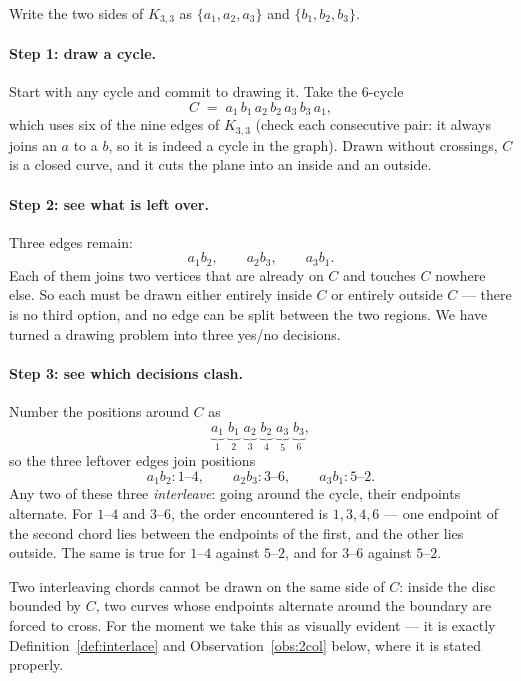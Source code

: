 \documentclass[11pt,a4paper]{article}
\theoremstyle{plain}
\theoremstyle{definition}
\theoremstyle{remark}
\begin{document}
Write the two sides of $K_{3,3}$ as $\{a_1,a_2,a_3\}$ and $\{b_1,b_2,b_3\}$.

\paragraph{Step 1: draw a cycle.}
Start with any cycle and commit to drawing it. Take the $6$-cycle
\[
  C \;=\; a_1 \, b_1 \, a_2 \, b_2 \, a_3 \, b_3 \, a_1 ,
\]
which uses six of the nine edges of $K_{3,3}$ (check each consecutive pair: it
always joins an $a$ to a $b$, so it is indeed a cycle in the graph). Drawn
without crossings, $C$ is a closed curve, and it cuts the plane into an inside
and an outside.

\paragraph{Step 2: see what is left over.}
Three edges remain:
\[
  a_1b_2, \qquad a_2b_3, \qquad a_3b_1 .
\]
Each of them joins two vertices that are already on $C$ and touches $C$ nowhere
else. So each must be drawn either entirely inside $C$ or entirely outside
$C$ --- there is no third option, and no edge can be split between the two
regions. We have turned a drawing problem into three yes/no decisions.

\paragraph{Step 3: see which decisions clash.}
Number the positions around $C$ as
\[
  \underbrace{a_1}_{1}\;\underbrace{b_1}_{2}\;\underbrace{a_2}_{3}\;
  \underbrace{b_2}_{4}\;\underbrace{a_3}_{5}\;\underbrace{b_3}_{6},
\]
so the three leftover edges join positions
\[
  a_1b_2 : 1\text{--}4, \qquad a_2b_3 : 3\text{--}6, \qquad a_3b_1 : 5\text{--}2 .
\]
Any two of these three \emph{interleave}: going around the cycle, their
endpoints alternate. For $1\text{--}4$ and $3\text{--}6$, the order encountered
is $1,3,4,6$ --- one endpoint of the second chord lies between the endpoints of
the first, and the other lies outside. The same is true for $1\text{--}4$
against $5\text{--}2$, and for $3\text{--}6$ against $5\text{--}2$.

Two interleaving chords cannot be drawn on the same side of $C$: inside the
disc bounded by $C$, two curves whose endpoints alternate around the boundary
are forced to cross. For the moment we take this as visually evident --- it is
exactly Definition~\ref{def:interlace} and Observation~\ref{obs:2col} below,
where it is stated properly.
\end{document}
